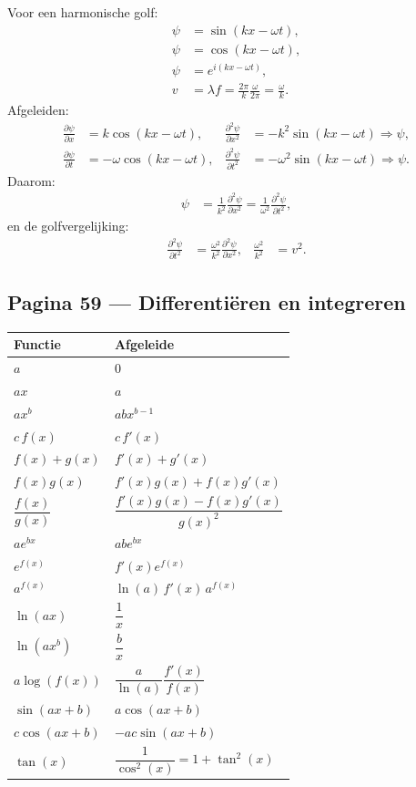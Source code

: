 \documentclass[11pt]{article}
\newcommand{\pd}[2]{\frac{\partial #1}{\partial #2}}
\begin{document}
Voor een harmonische golf:
\begin{align*}
\psi&=\sin(kx-\omega t),\\
\psi&=\cos(kx-\omega t),\\
\psi&=e^{i(kx-\omega t)},\\
v&=\lambda f
 = \frac{2\pi}{k}\frac{\omega}{2\pi}
 = \frac{\omega}{k}.
\end{align*}
Afgeleiden:
\begin{align*}
\pd{\psi}{x}&=k\cos(kx-\omega t),&
\pd{^2\psi}{x^2}&=-k^2\sin(kx-\omega t)\Rightarrow \psi,\\
\pd{\psi}{t}&=-\omega\cos(kx-\omega t),&
\pd{^2\psi}{t^2}&=-\omega^2\sin(kx-\omega t)\Rightarrow \psi.
\end{align*}
Daarom:
\begin{align*}
\psi
&=
\frac{1}{k^2}\pd{^2\psi}{x^2}
=
\frac{1}{\omega^2}\pd{^2\psi}{t^2},
\end{align*}
en de golfvergelijking:
\begin{align*}
\pd{^2\psi}{t^2}
&=
\frac{\omega^2}{k^2}
\pd{^2\psi}{x^2},
&
\frac{\omega^2}{k^2}&=v^2.
\end{align*}

\subsection*{Pagina 59 --- Differentiëren en integreren}

\begin{center}
\begin{longtable}{>{\raggedright\arraybackslash}p{5cm}p{8cm}}
\toprule
\textbf{Functie} & \textbf{Afgeleide}\\
\midrule
$a$ & $0$\\
$ax$ & $a$\\
$ax^b$ & $abx^{b-1}$\\
$c\,f(x)$ & $c\,f'(x)$\\
$f(x)+g(x)$ & $f'(x)+g'(x)$\\
$f(x)g(x)$ & $f'(x)g(x)+f(x)g'(x)$\\
$\dfrac{f(x)}{g(x)}$ &
$\dfrac{f'(x)g(x)-f(x)g'(x)}{g(x)^2}$\\
$ae^{bx}$ & $abe^{bx}$\\
$e^{f(x)}$ & $f'(x)e^{f(x)}$\\
$a^{f(x)}$ & $\ln(a)\,f'(x)\,a^{f(x)}$\\
$\ln(ax)$ & $\dfrac{1}{x}$\\
$\ln(ax^b)$ & $\dfrac{b}{x}$\\
$a\log(f(x))$ & $\dfrac{a}{\ln(a)}\dfrac{f'(x)}{f(x)}$\\
$\sin(ax+b)$ & $a\cos(ax+b)$\\
$c\cos(ax+b)$ & $-a c\sin(ax+b)$\\
$\tan(x)$ & $\dfrac{1}{\cos^2(x)}=1+\tan^2(x)$\\
\bottomrule
\end{longtable}
\end{center}
\end{document}
